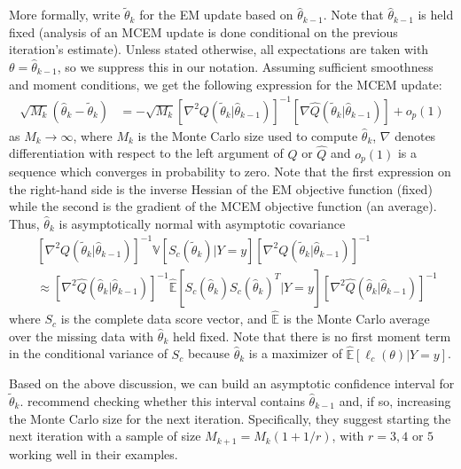 \documentclass[11pt, oneside]{article}   	%
\newcommand{\bV}{\mathbb{V}}
\newcommand{\bE}{\mathbb{E}}
\newcommand{\hq}{\hat{Q}}
\begin{document}
More formally, write $\tilde{\theta}_k$ for the EM update based on $\hat{\theta}_{k-1}$. Note that $\hat{\theta}_{k-1}$ is held fixed (analysis of an MCEM update is done conditional on the previous iteration's estimate). Unless stated otherwise, all expectations are taken with $\theta = \hat{\theta}_{k-1}$, so we suppress this in our notation. Assuming sufficient smoothness and moment conditions, we get the following expression for the MCEM update:
%
\begin{align}
    \sqrt{M_k}(\hat{\theta}_k - \tilde{\theta}_k) &= - \sqrt{M_k} \left[ \nabla^2 Q(\tilde{\theta}_k|\hat{\theta}_{k-1})\right]^{-1} \left[\nabla \hq(\tilde{\theta}_k|\hat{\theta}_{k-1}) \right] + o_p(1) \label{eq:th_as_dist}
\end{align}
%
as $M_k \rightarrow \infty$, where $M_k$ is the Monte Carlo size used to compute $\hat{\theta}_k$, $\nabla$ denotes differentiation with respect to the left argument of $Q$ or $\hat{Q}$ and $o_p(1)$ is a sequence which converges in probability to zero. Note that the first expression on the right-hand side is the inverse Hessian of the EM objective function (fixed) while the second is the gradient of the MCEM objective function (an average). Thus, $\hat{\theta}_k$ is asymptotically normal with asymptotic covariance
%
\begin{align}
    &\left[ \nabla^2 Q(\tilde{\theta}_k|\hat{\theta}_{k-1})\right]^{-1} \bV \left[ S_c (\tilde{\theta}_k) | Y=y \right] \left[ \nabla^2 Q(\tilde{\theta}_k|\hat{\theta}_{k-1})\right]^{-1}\\
    &\approx \left[ \nabla^2 \hat{Q}(\hat{\theta}_k|\hat{\theta}_{k-1})\right]^{-1} \hat{\bE} \left[ S_c(\hat{\theta}_k) S_c(\hat{\theta}_k)^T | Y=y \right] \left[ \nabla^2 \hat{Q}(\hat{\theta}_k|\hat{\theta}_{k-1})\right]^{-1} 
\end{align}
%
where $S_c$ is the complete data score vector, and $\hat{\bE}$ is the Monte Carlo average over the missing data with $\hat{\theta}_k$ held fixed. Note that there is no first moment term in the conditional variance of $S_c$ because $\hat{\theta}_k$ is a maximizer of $\hat{\bE} [\ell_c (\theta) |Y=y]$.

Based on the above discussion, we can build an asymptotic confidence interval for $\tilde{\theta}_k$. \citeauthor{Boo99} recommend checking whether this interval contains $\hat{\theta}_{k-1}$ and, if so, increasing the Monte Carlo size for the next iteration. Specifically, they suggest starting the next iteration with a sample of size $M_{k+1} = M_k ( 1 + 1/r)$, with $r = 3,4$ or $5$ working well in their examples.
\end{document}

